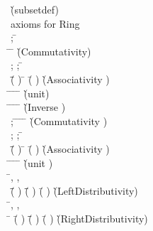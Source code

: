 \begin{hetcasl}
\> \`{\small{}\KW{\%}(subset\Ax{\_}def)\KW{\%}}\\
\> {\small{}\KW{\%\%} axioms for Ring}\\
\> \Ax{\forall}  \Ax{:} ; \= \Ax{:}  \\
\> \Ax{\bullet} \= \Ax{+}  \Ax{=} \= \Ax{+}  \`{\small{}\KW{\%}(Commutativity\Ax{\_}\Ax{+})\KW{\%}}\\
\> \Ax{\forall}  \Ax{:} ;  \Ax{:} ; \= \Ax{:}  \\
\> \Ax{\bullet} \=(\= \Ax{+} ) \Ax{+}  \Ax{=} \= \Ax{+} (\= \Ax{+} ) \`{\small{}\KW{\%}(Associativity \Ax{+})\KW{\%}}\\
\> \Ax{\forall} \= \Ax{:}  \=\Ax{\bullet} \= \Ax{+}  \Ax{=}  \Ax{\wedge} \= \Ax{+}  \Ax{=}  \`{\small{}\KW{\%}(unit\Ax{\_}\Ax{+})\KW{\%}}\\
\> \Ax{\forall} \= \Ax{:}  \=\Ax{\bullet} \=\Ax{\exists}  \Ax{:}  \Ax{\bullet} \= \Ax{+}  \Ax{=}  \`{\small{}\KW{\%}(Inverse \Ax{+})\KW{\%}}\\
\> \Ax{\forall}  \Ax{:} ; \= \Ax{:}  \=\Ax{\bullet} \= \Ax{*}  \Ax{=} \= \Ax{*}  \`{\small{}\KW{\%}(Commutativity \Ax{*})\KW{\%}}\\
\> \Ax{\forall}  \Ax{:} ;  \Ax{:} ; \= \Ax{:}  \\
\> \Ax{\bullet} \=(\= \Ax{*} ) \Ax{*}  \Ax{=} \= \Ax{*} (\= \Ax{*} ) \`{\small{}\KW{\%}(Associativity \Ax{*})\KW{\%}}\\
\> \Ax{\forall} \= \Ax{:}  \=\Ax{\bullet} \= \Ax{*}  \Ax{=}  \Ax{\wedge} \= \Ax{*}  \Ax{=}  \`{\small{}\KW{\%}(unit \Ax{*})\KW{\%}}\\
\> \Ax{\forall} \=, ,  \Ax{:}  \\
\> \Ax{\bullet} \=(\= \Ax{+} ) \Ax{*}  \Ax{=} \=(\= \Ax{*} ) \Ax{+} (\= \Ax{*} ) \`{\small{}\KW{\%}(Left\Ax{\_}Distributivity)\KW{\%}}\\
\> \Ax{\forall} \=, ,  \Ax{:}  \\
\> \Ax{\bullet} \= \Ax{*} (\= \Ax{+} ) \Ax{=} \=(\= \Ax{*} ) \Ax{+} (\= \Ax{*} ) \`{\small{}\KW{\%}(Right\Ax{\_}Distributivity)\KW{\%}}\\

\end{hetcasl}
